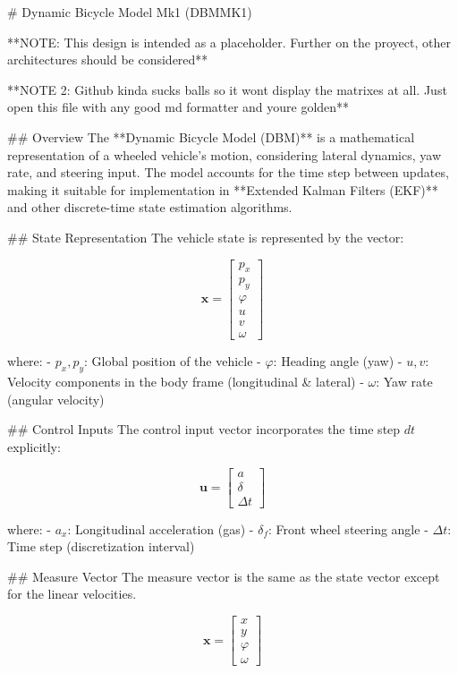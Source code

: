 # Dynamic Bicycle Model Mk1 (DBMMK1)

**NOTE: This design is intended as a placeholder. Further on the proyect, other architectures should be considered**

**NOTE 2: Github kinda sucks balls so it wont display the matrixes at all. Just open this file with any good md formatter and youre golden**

## Overview
The **Dynamic Bicycle Model (DBM)** is a mathematical representation of a wheeled vehicle’s motion, considering lateral dynamics, yaw rate, and steering input. The model accounts for the time step between updates, making it suitable for implementation in **Extended Kalman Filters (EKF)** and other discrete-time state estimation algorithms.

## State Representation
The vehicle state is represented by the vector:

\[
\mathbf{x} =
\begin{bmatrix}
p_x \\ p_y \\ \varphi\\ u \\ v \\ \omega
\end{bmatrix}
\]

where:
- \(p_x, p_y\): Global position of the vehicle
- \(\varphi\): Heading angle (yaw)
- \(u, v\): Velocity components in the body frame (longitudinal & lateral)
- \(\omega\): Yaw rate (angular velocity)

## Control Inputs
The control input vector incorporates the time step \( dt \) explicitly:

\[
\mathbf{u} =
\begin{bmatrix}
a \\ \delta \\ \Delta t
\end{bmatrix}
\]

where:
- \(a_x\): Longitudinal acceleration (gas)
- \(\delta_f\): Front wheel steering angle
- \(\Delta t\): Time step (discretization interval)

## Measure Vector 
The measure vector is the same as the state vector except for the linear velocities. 

\[
\mathbf{x} =
\begin{bmatrix}
x \\ y \\ \varphi \\ \omega
\end{bmatrix}
\]

